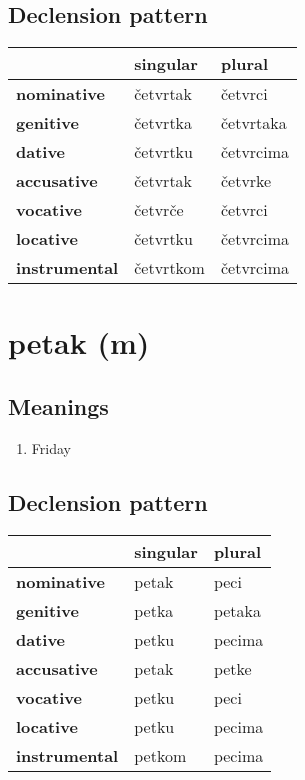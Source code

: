 \subsection*{Declension pattern}
\begin{tabularx}{\linewidth}{Xll}
\toprule
{} &   singular &     plural \\
\midrule
\textbf{nominative  } &   četvrtak &    četvrci \\
\textbf{genitive    } &   četvrtka &  četvrtaka \\
\textbf{dative      } &   četvrtku &  četvrcima \\
\textbf{accusative  } &   četvrtak &    četvrke \\
\textbf{vocative    } &    četvrče &    četvrci \\
\textbf{locative    } &   četvrtku &  četvrcima \\
\textbf{instrumental} &  četvrtkom &  četvrcima \\
\bottomrule
\end{tabularx}

\filbreak
\section{petak (m)}
\subsection*{Meanings}
\begin{enumerate}
\item Friday
\end{enumerate}
\subsection*{Declension pattern}
\begin{tabularx}{\linewidth}{Xll}
\toprule
{} & singular &  plural \\
\midrule
\textbf{nominative  } &    petak &    peci \\
\textbf{genitive    } &    petka &  petaka \\
\textbf{dative      } &    petku &  pecima \\
\textbf{accusative  } &    petak &   petke \\
\textbf{vocative    } &    petku &    peci \\
\textbf{locative    } &    petku &  pecima \\
\textbf{instrumental} &   petkom &  pecima \\
\bottomrule
\end{tabularx}

